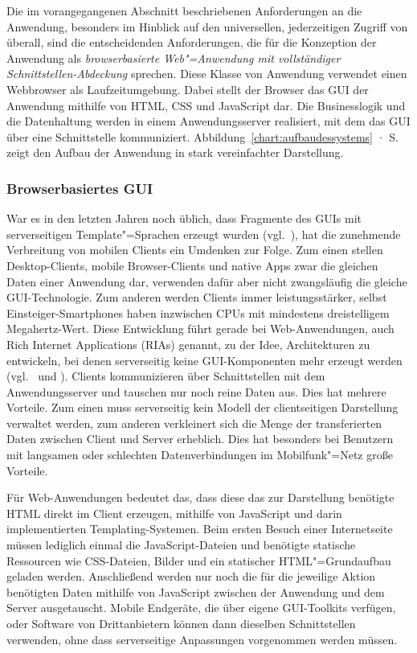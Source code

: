 Die im vorangegangenen Abschnitt beschriebenen Anforderungen an die Anwendung, besonders im Hinblick auf den universellen, jederzeitigen Zugriff von überall, sind die entscheidenden Anforderungen, die für die Konzeption der Anwendung als \emph{browserbasierte Web"=Anwendung mit vollständiger Schnittstellen-Abdeckung} sprechen. Diese Klasse von Anwendung verwendet einen Webbrowser als Laufzeitumgebung. Dabei stellt der Browser das GUI der Anwendung mithilfe von HTML, CSS und JavaScript dar. Die Businesslogik und die Datenhaltung werden in einem Anwendungsserver realisiert, mit dem das GUI über eine Schnittstelle kommuniziert. Abbildung~\ref{chart:aufbaudessystems} · S.\pageref{chart:aufbaudessystems} zeigt den Aufbau der Anwendung in stark vereinfachter Darstellung. 

\subsubsection{Browserbasiertes GUI}

War es in den letzten Jahren noch üblich, dass Fragmente des GUIs mit serverseitigen Template"=Sprachen erzeugt wurden (vgl.~\cite[S.48]{dunkel2008systemarchitekturen}), hat die zunehmende Verbreitung von mobilen Clients ein Umdenken zur Folge. Zum einen stellen Desktop-Clients, mobile Browser-Clients und native Apps zwar die gleichen Daten einer Anwendung dar, verwenden dafür aber nicht zwangsläufig die gleiche GUI-Technologie. Zum anderen werden Clients immer leistungsstärker, selbst Einsteiger-Smartphones haben inzwischen CPUs mit mindestens dreistelligem Megahertz-Wert. Diese Entwicklung führt gerade bei Web-Anwendungen, auch Rich Internet Applications (RIAs) genannt, zu der Idee, Architekturen zu entwickeln, bei denen serverseitig keine GUI-Komponenten mehr erzeugt werden (vgl.~\cite{maccaw2011javascript} und \cite{coates2012phptemplating}). Clients kommunizieren über Schnittstellen mit dem Anwendungsserver und tauschen nur noch reine Daten aus. Dies hat mehrere Vorteile. Zum einen muss serverseitig kein Modell der clientseitigen Darstellung verwaltet werden, zum anderen verkleinert sich die Menge der transferierten Daten zwischen Client und Server erheblich. Dies hat besonders bei Benutzern mit langsamen oder schlechten Datenverbindungen im Mobilfunk"=Netz große Vorteile. 

Für Web-Anwendungen bedeutet das, dass diese das zur Darstellung benötigte HTML direkt im Client erzeugen, mithilfe von JavaScript und darin implementierten Templating-Systemen. Beim ersten Besuch einer Internetseite müssen lediglich einmal die JavaScript-Dateien und benötigte statische Ressourcen wie CSS-Dateien, Bilder und ein statischer HTML"=Grundaufbau geladen werden. Anschließend werden nur noch die für die jeweilige Aktion benötigten Daten mithilfe von JavaScript zwischen der Anwendung und dem Server ausgetauscht. Mobile Endgeräte, die über eigene GUI-Toolkits verfügen, oder Software von Drittanbietern können dann dieselben Schnittstellen verwenden, ohne dass serverseitige Anpassungen vorgenommen werden müssen.

